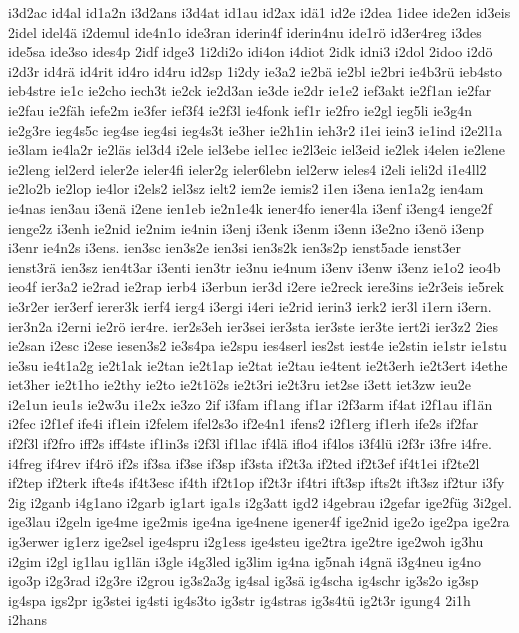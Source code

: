 {i3d2ac
id4al
id1a2n
i3d2ans
i3d4at
id1au
id2ax
idä1
id2e
i2dea
1idee
ide2en
id3eis
2idel
idel4ä
i2demul
ide4n1o
ide3ran
iderin4f
iderin4nu
ide1rö
id3er4reg
i3des
ide5sa
ide3so
ides4p
2idf
idge3
1i2di2o
idi4on
i4diot
2idk
idni3
i2dol
2idoo
i2dö
i2d3r
id4rä
id4rit
id4ro
id4ru
id2sp
1i2dy
ie3a2
ie2bä
ie2bl
ie2bri
ie4b3rü
ieb4sto
ieb4stre
ie1c
ie2cho
iech3t
ie2ck
ie2d3an
ie3de
ie2dr
ie1e2
ief3akt
ie2f1an
ie2far
ie2fau
ie2fäh
iefe2m
ie3fer
ief3f4
ie2f3l
ie4fonk
ief1r
ie2fro
ie2gl
ieg5li
ie3g4n
ie2g3re
ieg4s5c
ieg4se
ieg4si
ieg4s3t
ie3her
ie2h1in
ieh3r2
i1ei
iein3
ie1ind
i2e2l1a
ie3lam
ie4la2r
ie2läs
iel3d4
i2ele
iel3ebe
iel1ec
ie2l3eic
iel3eid
ie2lek
i4elen
ie2lene
ie2leng
iel2erd
ieler2e
ieler4fi
ieler2g
ieler6lebn
iel2erw
ieles4
i2eli
ieli2d
i1e4ll2
ie2lo2b
ie2lop
ie4lor
i2els2
iel3sz
ielt2
iem2e
iemis2
i1en
i3ena
ien1a2g
ien4am
ie4nas
ien3au
i3enä
i2ene
ien1eb
ie2n1e4k
iener4fo
iener4la
i3enf
i3eng4
ienge2f
ienge2z
i3enh
ie2nid
ie2nim
ie4nin
i3enj
i3enk
i3enm
i3enn
i3e2no
i3enö
i3enp
i3enr
ie4n2s
i3ens.
ien3sc
ien3s2e
ien3si
ien3s2k
ien3s2p
ienst5ade
ienst3er
ienst3rä
ien3sz
ien4t3ar
i3enti
ien3tr
ie3nu
ie4num
i3env
i3enw
i3enz
ie1o2
ieo4b
ieo4f
ier3a2
ie2rad
ie2rap
ierb4
i3erbun
ier3d
i2ere
ie2reck
iere3ins
ie2r3eis
ie5rek
ie3r2er
ier3erf
ierer3k
ierf4
ierg4
i3ergi
i4eri
ie2rid
ierin3
ierk2
ier3l
i1ern
i3ern.
ier3n2a
i2erni
ie2rö
ier4re.
ier2s3eh
ier3sei
ier3sta
ier3ste
ier3te
iert2i
ier3z2
2ies
ie2san
i2esc
i2ese
iesen3s2
ie3s4pa
ie2spu
ies4serl
ies2st
iest4e
ie2stin
ie1str
ie1stu
ie3su
ie4t1a2g
ie2t1ak
ie2tan
ie2t1ap
ie2tat
ie2tau
ie4tent
ie2t3erh
ie2t3ert
i4ethe
iet3her
ie2t1ho
ie2thy
ie2to
ie2t1ö2s
ie2t3ri
ie2t3ru
iet2se
i3ett
iet3zw
ieu2e
i2e1un
ieu1s
ie2w3u
i1e2x
ie3zo
2if
i3fam
if1ang
if1ar
i2f3arm
if4at
i2f1au
if1än
i2fec
i2f1ef
ife4i
if1ein
i2felem
ifel2s3o
if2e4n1
ifens2
i2f1erg
if1erh
ife2s
if2far
if2f3l
if2fro
iff2s
iff4ste
if1in3s
i2f3l
if1lac
if4lä
iflo4
if4los
i3f4lü
i2f3r
i3fre
i4fre.
i4freg
if4rev
if4rö
if2s
if3sa
if3se
if3sp
if3sta
if2t3a
if2ted
if2t3ef
if4t1ei
if2te2l
if2tep
if2terk
ifte4s
if4t3esc
if4th
if2t1op
if2t3r
if4tri
ift3sp
ifts2t
ift3sz
if2tur
i3fy
2ig
i2ganb
i4g1ano
i2garb
ig1art
iga1s
i2g3att
igd2
i4gebrau
i2gefar
ige2füg
3i2gel.
ige3lau
i2geln
ige4me
ige2mis
ige4na
ige4nene
igener4f
ige2nid
ige2o
ige2pa
ige2ra
ig3erwer
ig1erz
ige2sel
ige4spru
i2g1ess
ige4steu
ige2tra
ige2tre
ige2woh
ig3hu
i2gim
i2gl
ig1lau
ig1län
i3gle
i4g3led
ig3lim
ig4na
ig5nah
i4gnä
i3g4neu
ig4no
igo3p
i2g3rad
i2g3re
i2grou
ig3s2a3g
ig4sal
ig3sä
ig4scha
ig4schr
ig3s2o
ig3sp
ig4spa
igs2pr
ig3stei
ig4sti
ig4s3to
ig3str
ig4stras
ig3s4tü
ig2t3r
igung4
2i1h
i2hans
}

